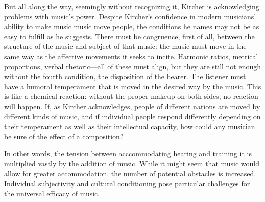 But all along the way, seemingly without recognizing it, Kircher is acknowledging problems with music's power.
Despite Kircher's confidence in modern musicians' ability to make music music move people, the conditions he names may not be as easy to fulfill as he suggests.
There must be congruence, first of all, between the structure of the music and subject of that music: the music must move in the same way as the affective movements it seeks to incite.
Harmonic ratios, metrical proportions, verbal rhetoric---all of these must align, but they are still not enough without the fourth condition, the disposition of the hearer.
The listener must have a humoral temperament that is moved in the desired way by the music. 
This is like a chemical reaction: without the proper makeup on both sides, no reaction will happen.
If, as Kircher acknowledges, people of different nations are moved by different kinds of music, and if individual people respond differently depending on their temperament as well as their intellectual capacity, how could any musician be sure of the effect of a composition?

In other words, the tension between acccommodating hearing and training it is multiplied vastly by the addition of music.
While it might seem that music would allow for greater accommodation, the number of potential obstacles is increased.
Individual subjectivity and cultural conditioning pose particular challenges for the universal efficacy of music.












